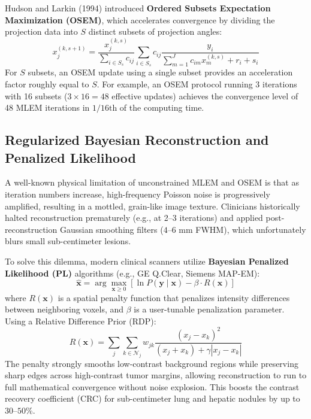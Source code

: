 \documentclass[11pt,a4paper]{article}
\begin{document}
Hudson and Larkin (1994) introduced \textbf{Ordered Subsets Expectation Maximization (OSEM)}, which accelerates convergence by dividing the projection data into $S$ distinct subsets of projection angles:
\begin{equation}
    x_j^{(k, s+1)} = \frac{x_j^{(k, s)}}{\sum_{i \in S_s} c_{ij}} \sum_{i \in S_s} c_{ij} \frac{y_i}{\sum_{m=1}^J c_{im} x_m^{(k, s)} + r_i + s_i}
\end{equation}
For $S$ subsets, an OSEM update using a single subset provides an acceleration factor roughly equal to $S$. For example, an OSEM protocol running 3 iterations with 16 subsets ($3 \times 16 = 48$ effective updates) achieves the convergence level of 48 MLEM iterations in $1/16\text{th}$ of the computing time.

\subsection{Regularized Bayesian Reconstruction and Penalized Likelihood}
A well-known physical limitation of unconstrained MLEM and OSEM is that as iteration numbers increase, high-frequency Poisson noise is progressively amplified, resulting in a mottled, grain-like image texture. Clinicians historically halted reconstruction prematurely (e.g., at 2--3 iterations) and applied post-reconstruction Gaussian smoothing filters ($4\text{--}6\text{ mm}$ FWHM), which unfortunately blurs small sub-centimeter lesions.

To solve this dilemma, modern clinical scanners utilize \textbf{Bayesian Penalized Likelihood (PL)} algorithms (e.g., GE Q.Clear, Siemens MAP-EM):
\begin{equation}
    \hat{\mathbf{x}} = \arg \max_{\mathbf{x} \ge 0} \left[ \ln P(\mathbf{y} \mid \mathbf{x}) - \beta \cdot R(\mathbf{x}) \right]
\end{equation}
where $R(\mathbf{x})$ is a spatial penalty function that penalizes intensity differences between neighboring voxels, and $\beta$ is a user-tunable penalization parameter. Using a Relative Difference Prior (RDP):
\begin{equation}
    R(\mathbf{x}) = \sum_{j} \sum_{k \in \mathcal{N}_j} w_{jk} \frac{(x_j - x_k)^2}{(x_j + x_k) + \gamma |x_j - x_k|}
\end{equation}
The penalty strongly smooths low-contrast background regions while preserving sharp edges across high-contrast tumor margins, allowing reconstruction to run to full mathematical convergence without noise explosion. This boosts the contrast recovery coefficient (CRC) for sub-centimeter lung and hepatic nodules by up to $30\text{--}50\%$.
\end{document}
